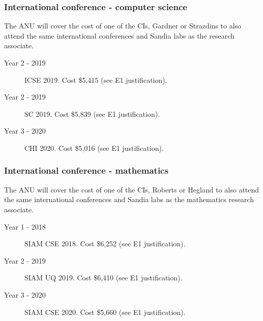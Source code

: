 \documentclass[a4paper,twoside,12pt,compact]{article}
\begin{document}
\subsubsection*{International conference - computer science}


The ANU will cover the cost of one of the CIs, Gardner or Strazdins 
to also attend the same international conferences and Sandia labs as the 
research associate. 


\begin{description}
\item[Year 2 - 2019] ICSE 2019. Cost \$5,415  (see E1 justification).

\item[Year 2 - 2019] SC 2019.  Cost \$5,839  (see E1 justification).

\item[Year 3 - 2020] CHI 2020.  Cost \$5,016 (see E1 justification).

\end{description}


\subsubsection*{International conference - mathematics}

The ANU will cover the cost of one of the CIs, Roberts or Hegland 
to also attend the same international conferences and Sandia labs as the 
mathematics research associate. 


\begin{description}
\item[Year 1 - 2018] SIAM CSE 2018.  Cost \$6,252   (see E1 justification).

\item[Year 2 - 2019] SIAM UQ 2019.  Cost \$6,410  (see E1 justification).

\item[Year 3 - 2020]  SIAM CSE 2020.  Cost \$5,660   (see E1 justification).

\end{description}
\end{document}
